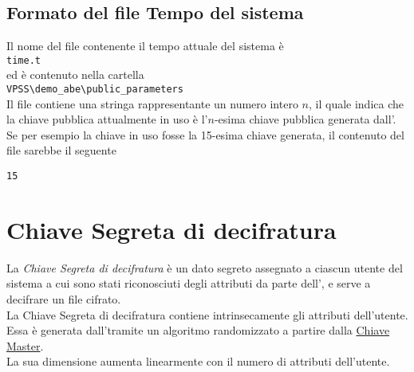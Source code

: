 \documentclass[a4paper,twoside,10pt,openany]{scrbook}
\begin{document}
\subsection{Formato del file Tempo del sistema}\label{sec:format_time}
%
Il nome del file contenente il tempo attuale del sistema è \\
\texttt{time.t}\\
ed è contenuto nella cartella\\
\texttt{VPSS\textbackslash demo\_abe\textbackslash public\_parameters}\\
Il file contiene una stringa rappresentante un numero intero $n$, il quale indica che la chiave pubblica attualmente in uso è l'$n$-esima chiave pubblica generata dall'\auth.\\
Se per esempio la chiave in uso fosse la 15-esima chiave generata, il contenuto del file sarebbe il seguente
\begin{verbatim}
15
\end{verbatim}
%
\section{Chiave Segreta di decifratura}\label{sec:sk}
La \emph{Chiave Segreta di decifratura} è un dato segreto assegnato a ciascun utente del sistema a cui sono stati riconosciuti degli attributi da parte dell'\auth, e serve a decifrare un file cifrato. \\
La Chiave Segreta di decifratura contiene intrinsecamente gli attributi dell'utente.\\
Essa è generata dall'\auth tramite un algoritmo randomizzato a partire dalla \hyperref[sec:mk]{Chiave Master}.\\
La sua dimensione aumenta linearmente con il numero di attributi dell'utente.
%
\end{document}
